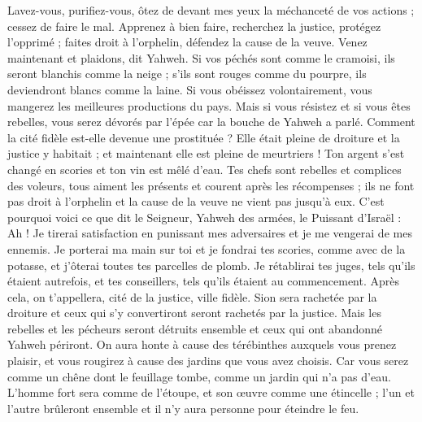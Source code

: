 \begin{multicols}{2}
Lavez-vous, purifiez-vous, ôtez de devant mes yeux la méchanceté de vos actions ; cessez de faire le mal.
Apprenez à bien faire, recherchez la justice, protégez l'opprimé ; faites droit à l'orphelin, défendez la cause de la veuve.
Venez maintenant et plaidons, dit Yahweh. Si vos péchés sont comme le cramoisi, ils seront blanchis comme la neige ; s'ils sont rouges comme du pourpre, ils deviendront blancs comme la laine.
Si vous obéissez volontairement, vous mangerez les meilleures productions du pays.
Mais si vous résistez et si vous êtes rebelles, vous serez dévorés par l'épée car la bouche de Yahweh a parlé.
Comment la cité fidèle est-elle devenue une prostituée ? Elle était pleine de droiture et la justice y habitait ; et maintenant elle est pleine de meurtriers !
Ton argent s'est changé en scories et ton vin est mêlé d'eau.
Tes chefs sont rebelles et complices des voleurs, tous aiment les présents et courent après les récompenses ; ils ne font pas droit à l'orphelin et la cause de la veuve ne vient pas jusqu'à eux.
C'est pourquoi voici ce que dit le Seigneur, Yahweh des armées, le Puissant d'Israël : Ah ! Je tirerai satisfaction en punissant mes adversaires et je me vengerai de mes ennemis.
Je porterai ma main sur toi et je fondrai tes scories, comme avec de la potasse, et j'ôterai toutes tes parcelles de plomb.
Je rétablirai tes juges, tels qu'ils étaient autrefois, et tes conseillers, tels qu'ils étaient au commencement. Après cela, on t'appellera, cité de la justice, ville fidèle.
Sion sera rachetée par la droiture et ceux qui s'y convertiront seront rachetés par la justice.
Mais les rebelles et les pécheurs seront détruits ensemble et ceux qui ont abandonné Yahweh périront.
On aura honte à cause des térébinthes auxquels vous prenez plaisir, et vous rougirez à cause des jardins que vous avez choisis.
Car vous serez comme un chêne dont le feuillage tombe, comme un jardin qui n'a pas d'eau.
L'homme fort sera comme de l'étoupe, et son œuvre comme une étincelle ; l'un et l'autre brûleront ensemble et il n'y aura personne pour éteindre le feu.

\end{multicols}
